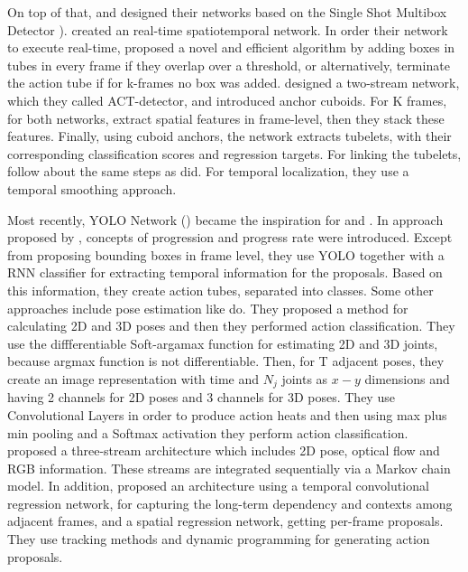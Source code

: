 On top of that, \cite{singh2016online} and \cite{kalogeiton17iccv:hal-01519812} designed their networks based on the Single Shot Multibox Detector \cite{DBLP:journals/corr/LiuAESR15}).
\cite{singh2016online} created an real-time spatiotemporal network. In order their network to execute real-time,  \cite{singh2016online} proposed a novel and efficient algorithm
by adding boxes in tubes in every frame if they overlap over a threshold, or alternatively, terminate the action tube if for k-frames no box was added.  \cite{kalogeiton17iccv:hal-01519812}
designed a two-stream network, which they called ACT-detector, and introduced anchor cuboids. For K frames, for both networks, \cite{kalogeiton17iccv:hal-01519812} extract spatial
features in frame-level, then they stack these features. Finally, using cuboid anchors, the network extracts tubelets,  with their corresponding classification
scores and regression targets. For linking the tubelets, \cite{kalogeiton17iccv:hal-01519812} follow about the same steps as \cite{singh2016online} did. For temporal localization, they use
a temporal smoothing approach. \par

Most recently, YOLO Network (\cite{DBLP:journals/corr/RedmonDGF15}) became the inspiration for \cite{DBLP:journals/corr/abs-1903-00304} and
\cite{DBLP:journals/corr/abs-1802-08362}. In approach proposed by \cite{DBLP:journals/corr/abs-1903-00304}, concepts of progression and progress
rate were introduced. Except from proposing bounding boxes in frame level, they use YOLO together with a RNN classifier for extracting temporal information for the proposals.
Based on this information, they create action tubes, separated into classes. Some other approaches include pose estimation like \cite{DBLP:journals/corr/abs-1802-09232} do. 
They proposed a method for calculating 2D and 3D poses and then they performed action classification. They use the diffferentiable Soft-argamax function for estimating 2D and 3D joints, because
argmax function is not differentiable. Then, for T adjacent poses, they create an image representation with time and $N_j$ joints as $x-y$ dimensions and having 2 channels for 2D poses and 3
channels for 3D poses. They use Convolutional Layers in order to produce action heats and then using max plus min pooling and a Softmax activation they perform action classification.
\cite{DBLP:journals/corr/ZolfaghariOSB17} proposed a three-stream architecture which includes 2D pose, optical flow and RGB information. These streams are integrated sequentially via a Markov
chain model. In addition, \cite{8237881} proposed an architecture using a temporal convolutional regression network, for capturing the long-term dependency and contexts among adjacent
frames, and a spatial regression network,
getting per-frame proposals. They use tracking methods and dynamic programming for generating action proposals.\par

